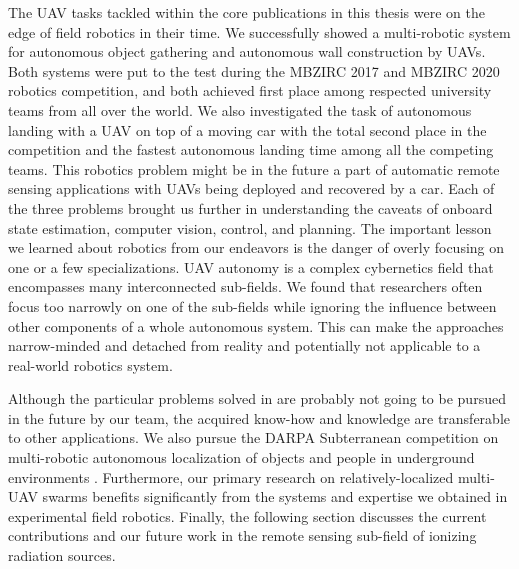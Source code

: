 \documentclass[a4paper,11pt,twoside,openright]{book}
\begin{document}
The \ac{UAV} tasks tackled within the core publications in this thesis were on the edge of field robotics in their time.
We successfully showed a multi-robotic system for autonomous object gathering \cite{spurny2019cooperative} and autonomous wall construction \cite{baca2020autonomous} by \acp{UAV}.
Both systems were put to the test during the \ac{MBZIRC} 2017 and \ac{MBZIRC} 2020 robotics competition, and both achieved first place among respected university teams from all over the world.
We also investigated the task of autonomous landing with a \ac{UAV} on top of a moving car \cite{baca2019autonomous} with the total second place in the competition and the fastest autonomous landing time among all the competing teams.
This robotics problem might be in the future a part of automatic remote sensing applications with \acp{UAV} being deployed and recovered by a car.
Each of the three problems brought us further in understanding the caveats of onboard state estimation, computer vision, control, and planning.
The important lesson we learned about robotics from our endeavors is the danger of overly focusing on one or a few specializations.
\ac{UAV} autonomy is a complex cybernetics field that encompasses many interconnected sub-fields.
We found that researchers often focus too narrowly on one of the sub-fields while ignoring the influence between other components of a whole autonomous system.
This can make the approaches narrow-minded and detached from reality and potentially not applicable to a real-world robotics system.

Although the particular problems solved in \cite{baca2019autonomous, spurny2019cooperative, baca2020autonomous} are probably not going to be pursued in the future by our team, the acquired know-how and knowledge are transferable to other applications.
We also pursue the \ac{DARPA} Subterranean competition on multi-robotic autonomous localization of objects and people in underground environments \cite{roucek2019darpa, kratky2020autonomous2, petrlik2020robust}.
Furthermore, our primary research on relatively-localized multi-\ac{UAV} swarms \cite{petracek2020bioinspired, saska2020formation, ahmad2020autonomous, dmytruk2020safe} benefits significantly from the systems and expertise we obtained in experimental field robotics.
Finally, the following section discusses the current contributions and our future work in the remote sensing sub-field of ionizing radiation sources.


\end{document}
